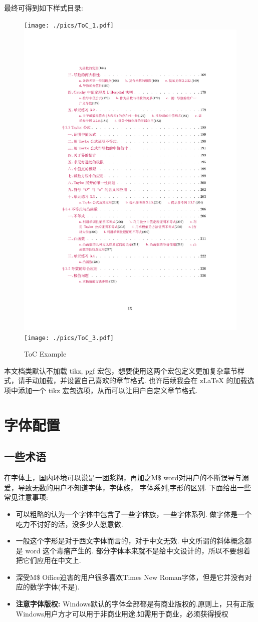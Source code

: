 最终可得到如下样式目录:
\begin{figure}[!htb]
    \centering
    \texttt{[image: ./pics/ToC\_1.pdf]}
    \includegraphics[width=.32\linewidth]{./pics/ToC_2.pdf}
    \texttt{[image: ./pics/ToC\_3.pdf]} 
    \caption{ToC Example}
    \label{fig:toc-example}
\end{figure}


\begin{remark}
本文档类默认不加载 {tikz, pgf} 宏包，想要使用这两个宏包定义更加复杂章节样式，请手动加载，并设置自己喜欢的章节格式. 
也许后续我会在 z\LaTeX{} 的加载选项中添加一个 tikz 宏包选项，从而可以让用户自定义章节格式.
\end{remark}

\clearpage
\section{字体配置}\label{font-config}
\subsection{一些术语}
在字体上，国内环境可以说是一团浆糊，再加之M\$ word对用户的不断误导与溺爱，导致无数的用户不知道字体，字体族，
字体系列,字形的区别. 下面给出一些常见注意事项:
\begin{itemize}
    \item 可以粗略的认为一个字体中包含了一些字体族，一些字体系列. 做字体是一个吃力不讨好的活，没多少人愿意做.
    \item 一般这个字形是对于西文字体而言的，对于中文无效. 中文所谓的斜体概念都是 word 这个毒瘤产生的.
      部分字体本来就不是给中文设计的，所以不要想着把它们应用在中文上.
    \item 深受M\$ Office迫害的用户很多喜欢Times New Roman字体，但是它并没有对应的数学字体(不是).
    \item \textbf{注意字体版权:} Windows默认的字体全部都是有商业版权的.原则上，只有正版Windows用户方才可以用于非商业用途.如需用于商业，必须获得授权
\end{itemize} 


